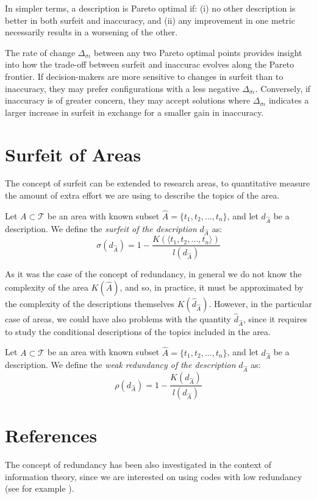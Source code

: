 In simpler terms, a description is Pareto optimal if: (i) no other description is better in both surfeit and inaccuracy, and (ii) any improvement in one metric necessarily results in a worsening of the other.

The rate of change $\Delta_{\sigma \iota}$ between any two Pareto optimal points provides insight into how the trade-off between surfeit and inaccurac evolves along the Pareto frontier. If decision-makers are more sensitive to changes in surfeit than to inaccuracy, they may prefer configurations with a less negative $\Delta_{\sigma \iota}$. Conversely, if inaccuracy is of greater concern, they may accept solutions where $\Delta_{\sigma \iota}$ indicates a larger increase in surfeit in exchange for a smaller gain in inaccuracy.

%
%

\section{Surfeit of Areas}

The concept of surfeit can be extended to research areas, to quantitative measure the amount of extra effort we are using to describe the topics of the area.

\begin{definition}
Let $A \subset \mathcal{T}$ be an area with known subset $\hat{A} = \{t_1, t_2, \ldots, t_n\}$, and let $d_{\hat{A}}$ be a description. We define the \emph{surfeit of the description} $d_{\hat{A}}$ as:
\[
\sigma \left( d_{\hat{A}} \right) = 1  - \frac{K( \langle t_1, t_2, \ldots, t_n \rangle )}{l \left( d_{\hat{A}} \right)}
\]
\end{definition}

As it was the case of the concept of redundancy, in general we do not know the complexity of the area $K(\hat{A})$, and so, in practice, it must be approximated by the complexity of the descriptions themselves $K(\hat{d}_{\hat{A}})$. However, in the particular case of areas, we could have also problems with the quantity $\hat{d}_{\hat{A}}$, since it requires to study the conditional descriptions of the topics included in the area.

\begin{definition}
Let $A \subset \mathcal{T}$ be an area with known subset $\hat{A} = \{t_1, t_2, \ldots, t_n\}$, and let $d_{\hat{A}}$ be a description. We define the \emph{weak redundancy of the description} $d_{\hat{A}}$ as:
\[
\rho(d_{\hat{A}}) =  1  - \frac{K \left( d_{\hat{A}} \right)}{l \left( d_{\hat{A}} \right)}
\]
\end{definition}

%
%

\section*{References}

The concept of redundancy has been also investigated in the context of information theory, since we are interested on using codes with low redundancy (see for example \cite{abramson1963information}).


